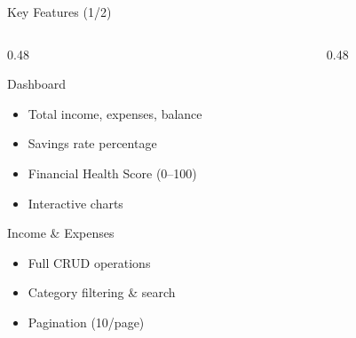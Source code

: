 \documentclass[aspectratio=169, 12pt]{beamer}
\begin{document}
\begin{frame}{Key Features (1/2)}

\begin{columns}[T]
\begin{column}{0.48\textwidth}

\begin{block}{Dashboard}
\begin{itemize}\itemsep=0pt
    \item Total income, expenses, balance
    \item Savings rate percentage
    \item Financial Health Score (0--100)
    \item Interactive charts
\end{itemize}
\end{block}

\begin{block}{Income \& Expenses}
\begin{itemize}\itemsep=0pt
    \item Full CRUD operations
    \item Category filtering \& search
    \item Pagination (10/page)
\end{itemize}
\end{block}

\end{column}
\begin{column}{0.48\textwidth}
\end{column}
\end{columns}
\end{frame}
\end{document}
